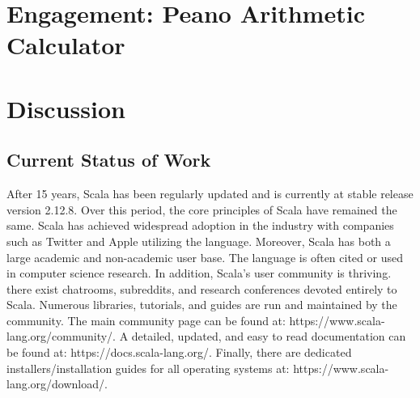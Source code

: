 \documentclass[jou,apacite]{IEEEtran}
\begin{document}



\section{Engagement: Peano Arithmetic Calculator}
\label{sec:engag-peano-arithm}

\section{Discussion}
\label{sec:discussion}

\subsection{Current Status of Work}
After 15 years, Scala has been regularly updated and is currently at stable
release version 2.12.8. Over this period, the core principles of Scala have
remained the same. Scala has achieved widespread adoption in the industry with
companies such as Twitter and Apple utilizing the language. Moreover, Scala has
both a large academic and non-academic user base. The language is often cited or
used in computer science research. In addition, Scala's user community is
thriving. there exist chatrooms, subreddits, and research conferences devoted
entirely to Scala. Numerous libraries, tutorials, and guides are run and
maintained by the community. The main community page can be found at:
https://www.scala-lang.org/community/. A detailed, updated, and easy to read
documentation can be found at: https://docs.scala-lang.org/. Finally, there are
dedicated installers/installation guides for all operating systems at:
https://www.scala-lang.org/download/.




\end{document}
